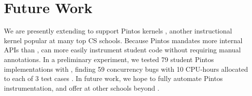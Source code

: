 \documentclass{sig-alternate-05-2015}
\newcommand\x[1]{\lstinline{#1}}
\begin{document}


\printccsdesc







\section{Future Work}

We are presently extending \landslide to support Pintos kernels \cite{pintos},
another instructional kernel popular at many top CS schools.
Because Pintos mandates more internal APIs than \pebbles,
\landslide can more easily instrument student code without requiring manual annotations.
In a preliminary experiment, we tested 79 student Pintos implementations with \landslide,
finding 59 concurrency bugs with 10 CPU-hours allocated to each of 3 test cases \cite{quicksand-anonymized}.
In future work, we hope to fully automate Pintos instrumentation, and offer \landslide at other schools beyond \cmu.






\end{document}
